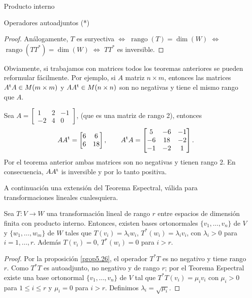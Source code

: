 \begin{chapter}{Producto interno}
\begin{section}{Operadores autoadjuntos (*)}
\begin{proof}
            Análogamente, $T$ es suryectiva   $\Leftrightarrow$  $\operatorname{rango}(T) = \dim(W)$ $\Leftrightarrow$ $\operatorname{rango}(TT^*) = \dim(W)$   $\Leftrightarrow$  $TT^*$  es inversible.
        \end{proof}
        
        \begin{obs*}
            Obviamente, si trabajamos con matrices todos  los teoremas anteriores se pueden reformular fácilmente. Por  ejemplo, si $A$ matriz $n \times m$, entonces  las  matrices $A^{{\operatorname{t}}}A \in M(m \times m)$ y $AA^{{\operatorname{t}}} \in M(n \times n)$ son  no negativas y tiene el mismo rango que $A$. 
        \end{obs*}
        
        \begin{ejemplo*}
            Sea $A = \begin{bmatrix}
            1&2&-1 \\
            -2& 4&0
            \end{bmatrix}$, (que es una matriz de rango 2), entonces
            $$
            AA^{{\operatorname{t}}} = \begin{bmatrix}
            6&6\\6&18
            \end{bmatrix}, \qquad 
            A^{{\operatorname{t}}}A = \begin{bmatrix}
            5&-6&-1\\-6&18&-2\\ -1&-2&1
            \end{bmatrix}.
            $$
            Por el  teorema  anterior ambas matrices son no negativas y tienen rango 2. En  consecuencia, $AA^{{\operatorname{t}}}$ is inversible y  por lo tanto positiva.
        \end{ejemplo*}
        
        A continuación una extensión del Teorema Espectral, válida para transformaciones lineales cualesquiera.
        
        \begin{teorema}
            Sea $T: V \to W$ una transformación lineal de rango $r$ entre espacios de dimensión finita 	con producto interno. Entonces, existen bases ortonormales $\{v_1,\ldots,v_n\}$ de $V$ y $\{w_1,\ldots,w_m\}$ de $W$ tales que $T(v_i) = \lambda_i w_i$,  $T^*(w_i) = \lambda_i v_i$, con $\lambda_i >0$ para $i=1,\ldots,r$. Además $T(v_i) = 0$,  $T^*(w_i) = 0$ para $i > r$. 
        \end{teorema}
        \begin{proof}
            Por la  proposición  \ref{prop5.26},  el operador $T^*T$ es no negativo y tiene rango  $r$. Como  $T^*T$  es autoadjunto, no negativo y  de rango  $r$; por el Teorema Espectral existe una base ortonormal $\{v_1,\ldots,v_n\}$ de $V$ tal que $T^*T(v_i) = \mu_i v_i$ con $\mu_i >0$ para $1 \le i \le r$ y  $\mu_i = 0$ para $i>r$. Definimos $\lambda_i = \sqrt{\mu_i}$. 
            

\end{proof}
\end{section}
\end{chapter}
